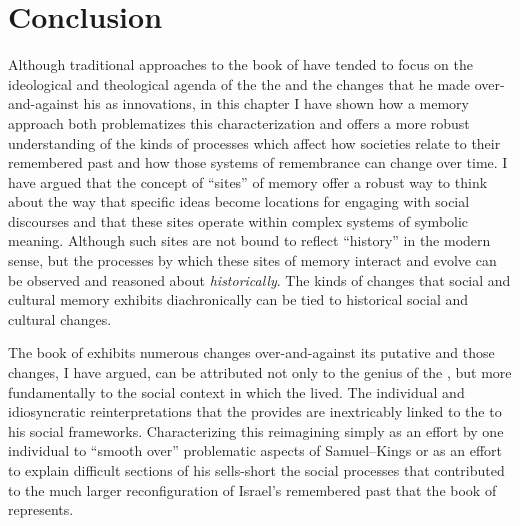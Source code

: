\section{Conclusion}

Although traditional approaches to the book of \chronicles have tended to focus on the ideological and theological agenda of the the \chronicler and the changes that he made over-and-against his \vorlage as innovations, in this chapter I have shown how a memory approach both problematizes this characterization and offers a more robust understanding of the kinds of processes which affect how societies relate to their remembered past and how those systems of remembrance can change over time. I have argued that the concept of ``sites'' of memory offer a robust way to think about the way that specific ideas become locations for engaging with social discourses and that these sites operate within complex systems of symbolic meaning. Although such sites are not bound to reflect ``history'' in the modern sense, but the processes by which these sites of memory interact and evolve can be observed and reasoned about \emph{historically}. The kinds of changes that social and cultural memory exhibits diachronically can be tied to historical social and cultural changes.

The book of \chronicles exhibits numerous changes over-and-against its putative \vorlage and those changes, I have argued, can be attributed not only to the genius of the \chronicler, but more fundamentally to the social context in which the \chronicler lived. The individual and idiosyncratic reinterpretations that the \chronicler provides are inextricably linked to the to his social frameworks. Characterizing this reimagining simply as an effort by one individual to ``smooth over'' problematic aspects of Samuel--Kings or as an effort to explain difficult sections of his \vorlage sells-short the social processes that contributed to the much larger reconfiguration of Israel's remembered past that the book of \chronicles represents.
